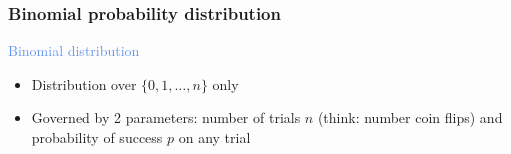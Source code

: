 \documentclass[dvipsnames]{beamer}
\begin{document}
\begin{frame}
 \frametitle{Binomial probability distribution}
 \begin{center}
 \textcolor{CornflowerBlue}{Binomial distribution}
 \end{center}

\begin{itemize}
  \item<only@2> Distribution over $\{0, 1, \dots,n\}$ only
  \item Governed by 2 parameters: number of trials $n$ (think: number coin flips) and probability of success $p$ on any trial
 \end{itemize}
\end{frame}
\end{document}
